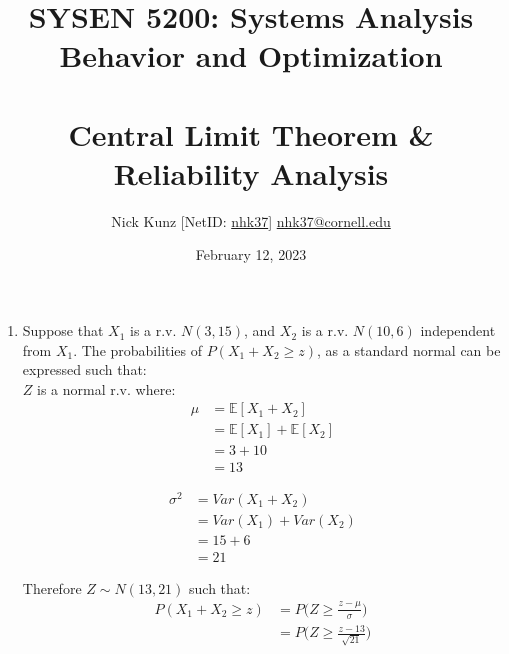 \documentclass{article}
\begin{document}
\title{SYSEN 5200: Systems Analysis Behavior and Optimization\\~\\
    \Large Central Limit Theorem \& Reliability Analysis
}
\author{
    Nick Kunz [NetID: \url{nhk37}] \hyperlink{nhk37@cornell.edu}{nhk37@cornell.edu}}
\date{February 12, 2023}
\maketitle
\thispagestyle{fancy}

\begin{enumerate}

    \item Suppose that $X_1$ is a r.v. $N(3,15)$, and $X_2$ is a r.v. $N(10,6)$ independent from $X_1$. The probabilities of $P(X_1 + X_2 \geq z)$, as a standard normal can be expressed such that:\\

    $Z$ is a normal r.v. where:
    \begin{equation}
        \begin{split}
            \mu &= \mathbb{E}{[X_1 + X_2]}\\
            &= \mathbb{E}{[X_1]} + \mathbb{E}{[X_2]}\\
            &= 3+10\\
            &= 13
        \end{split}
    \end{equation}
    
    \begin{equation}
        \begin{split}
            \sigma^2 &= Var(X_1 + X_2)\\
            &= Var(X_1) + Var(X_2)\\
            &= 15+6\\
            &= 21
        \end{split}
    \end{equation}

    Therefore $Z \sim N(13, 21)$ such that:
    \begin{equation}
        \begin{split}
            P(X_1 + X_2 \geq z) &= P\Big(Z \geq \frac{z - \mu}{\sigma}\Big)\\
            &= P\Big(Z \geq \frac{z - 13}{\sqrt{21}}\Big)
        \end{split}
    \end{equation}\\


\end{enumerate}
\end{document}
